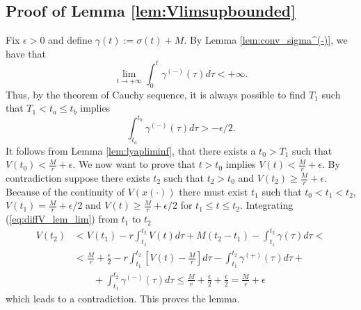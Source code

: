 \documentclass[letterpaper,10pt,conference,twocolumn]{IEEEtran}
\newtheorem{lem}[thm]{Lemma}
\newcommand{\eps}{\epsilon}
\newcommand{\w}{\omega}
\newcommand{\Real}{\mathbb{R}}
\begin{document}
\begin{appendix}
\subsection{Proof of Lemma \ref{lem:Vlimsupbounded}}
	Fix $\eps>0$ and define $\gamma(t):=\sigma(t)+M$.
	By Lemma \ref{lem:conv_sigma^(-)}, we have that
	\begin{equation*}
		\lim_{t\rightarrow +\infty}
			\int_0^{t}\gamma^{(-)}(\tau)d\tau<+\infty.
	\end{equation*}
	Thus, by the theorem of Cauchy sequence, it is always possible to find $T_1$
	such that $T_1<t_a\leq t_b$ implies
	\begin{equation*}
		\int_{t_a}^{t_b}\gamma^{(-)}(\tau)d\tau>-\eps/2.
	\end{equation*}
	It follows from Lemma \ref{lem:lyapliminf}, that there exists a $t_0>T_1$ such that $V(t_0)<\frac{M}{r}+\eps$. We now want to prove that $t>t_0$ implies $V(t)<\frac{M}{r}+\eps$. By contradiction suppose there exists $t_2$ such that $t_2>t_0$ and $V(t_2)\geq\frac{M}{r}+\eps$.
	Because of the continuity of $V(x(\cdot))$ there must exist
	$t_1$ such that $t_0<t_1<t_2$, $V(t_1)=\frac{M}{r}+\eps/2$
	and $V(t)\geq \frac{M}{r}+\eps/2$ for $t_1\leq t \leq t_2$.
	Integrating (\ref{eq:diffV_lem_lim}) from $t_1$ to $t_2$
	\begin{align*}
		V(t_2)	&<V(t_1)-r\int_{t_1}^{t_2}V(t)d\tau
				+M(t_2-t_1) -\int_{t_1}^{t_2}\gamma(\tau)d\tau <\\
			&<\frac{M}{r}+\frac{\eps}{2}
				-r\int_{t_1}^{t_2}\left[V(t)-\frac{M}{r}\right]d\tau
				-\int_{t_1}^{t_2}\gamma^{(+)}(\tau)d\tau +\\
				&\qquad+\int_{t_1}^{t_2}\gamma^{(-)}(\tau)d\tau
			\leq\frac{M}{r}+\frac{\eps}{2}+\frac{\eps}{2}=\frac{M}{r}+\eps
	\end{align*}
	which leads to a contradiction. This proves the lemma.

\end{appendix}


\end{document}
